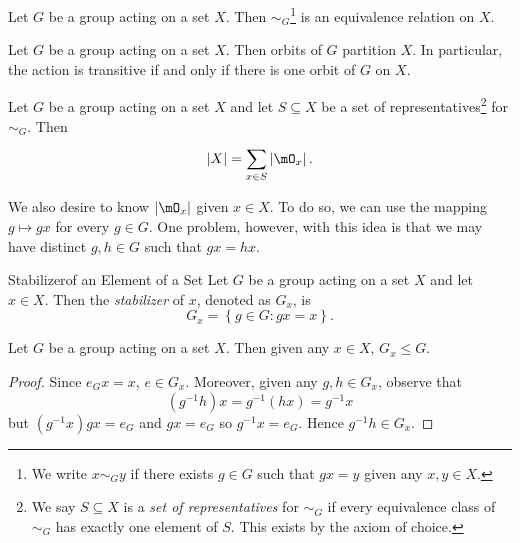 \documentclass[pmath347]{subfiles}
\begin{document}
    \begin{prop}{}
        Let $G$ be a group acting on a set $X$. Then $\sim_G$\footnote{We write $x\sim_G y$ if there exists $g\in G$ such that $gx=y$ given any $x,y\in X$.} is an equivalence relation on $X$.
    \end{prop}

    \clearpage
    \begin{cor}{}
        Let $G$ be a group acting on a set $X$. Then orbits of $G$ partition $X$. In particular, the action is transitive if and only if there is one orbit of $G$ on $X$.
    \end{cor}	

    \begin{cor}{}
        Let $G$ be a group acting on a set $X$ and let $S\subseteq X$ be a set of representatives\footnote{We say $S\subseteq X$ is a \emph{set of representatives} for $\sim_G$ if every equivalence class of $\sim_G$ has exactly one element of $S$. This exists by the axiom of choice.} for $\sim_G$. Then
        \begin{equation*}
            \left| X \right| = \sum^{}_{x\in S} \left| \mO_x \right| .
        \end{equation*}
    \end{cor}	

    \np We also desire to know $\left| \mO_x \right|$ given $x\in X$. To do so, we can use the mapping $g\mapsto gx$ for every $g\in G$. One problem, however, with this idea is that we may have distinct $g,h\in G$ such that $gx=hx$.

    \begin{definition}{Stabilizer}{of an Element of a Set}
        Let $G$ be a group acting on a set $X$ and let $x\in X$. Then the \emph{stabilizer} of $x$, denoted as $G_x$, is
        \begin{equation*}
            G_x = \left\lbrace g\in G: gx=x \right\rbrace .
        \end{equation*}
    \end{definition}

    \begin{prop}{}
        Let $G$ be a group acting on a set $X$. Then given any $x\in X$, $G_x\leq G$.
    \end{prop}

    \begin{proof}
        Since $e_Gx = x$, $e\in G_x$. Moreover, given any $g,h\in G_x$, observe that
        \begin{equation*}
            \left( g^{-1} h \right) x = g^{-1} \left( hx \right) = g^{-1} x
        \end{equation*}
        but $\left( g^{-1} x \right) gx = e_G$ and $gx = e_G$ so $g^{-1} x = e_G$. Hence $g^{-1} h\in G_x$.
    \end{proof}
\end{document}
